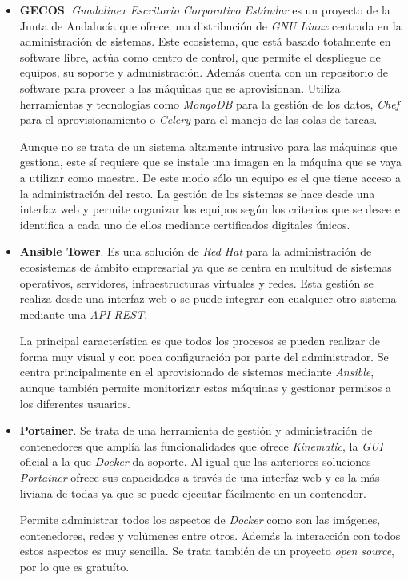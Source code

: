 \begin{itemize}
	\item \textbf{GECOS}. \textit{Guadalinex Escritorio Corporativo Estándar} es un proyecto de la Junta de Andalucía que ofrece una distribución de \textit{GNU Linux} centrada en la administración de sistemas. Este ecosistema, que está basado totalmente en software libre, actúa como centro de control, que permite el despliegue de equipos, su soporte y administración. Además cuenta con un repositorio de software para proveer a las máquinas que se aprovisionan. Utiliza herramientas y tecnologías como \textit{MongoDB} para la gestión de los datos, \textit{Chef} para el aprovisionamiento o \textit{Celery} para el manejo de las colas de tareas.
	
	Aunque no se trata de un sistema altamente intrusivo para las máquinas que gestiona, este sí requiere que se instale una imagen en la máquina que se vaya a utilizar como maestra. De este modo sólo un equipo es el que tiene acceso a la administración del resto. La gestión de los sistemas se hace desde una interfaz web y permite organizar los equipos según los criterios que se desee e identifica a cada uno de ellos mediante certificados digitales únicos.
		
	\item \textbf{Ansible Tower}. Es una solución de \textit{Red Hat} para la administración de ecosistemas de ámbito empresarial ya que se centra en multitud de sistemas operativos, servidores, infraestructuras virtuales y redes. Esta gestión se realiza desde una interfaz web o se puede integrar con cualquier otro sistema mediante una \textit{API REST}.
	
	La principal característica es que todos los procesos se pueden realizar de forma muy visual y con poca configuración por parte del administrador. Se centra principalmente en el aprovisionado de sistemas mediante \textit{Ansible}, aunque también permite monitorizar estas máquinas y gestionar permisos a los diferentes usuarios.
		
	\item \textbf{Portainer}. Se trata de una herramienta de gestión y administración de contenedores que amplía las funcionalidades que ofrece \textit{Kinematic}, la \textit{GUI} oficial a la que \textit{Docker} da soporte. Al igual que las anteriores soluciones \textit{Portainer} ofrece sus capacidades a través de una interfaz web y es la más liviana de todas ya que se puede ejecutar fácilmente en un contenedor.
	
	Permite administrar todos los aspectos de \textit{Docker} como son las imágenes, contenedores, redes y volúmenes entre otros. Además la interacción con todos estos aspectos es muy sencilla. Se trata también de un proyecto \textit{open source}, por lo que es gratuíto.
\end{itemize}


